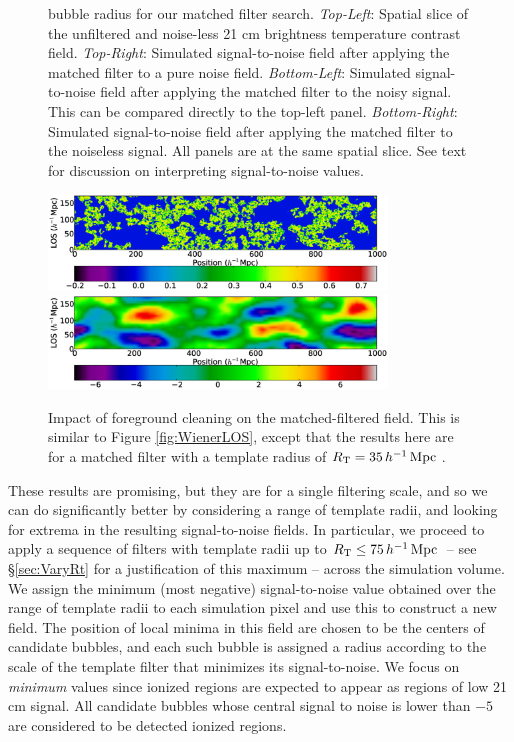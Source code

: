 \begin{figure}[h]
{    bubble radius for our matched filter search. \textit{Top-Left}: Spatial slice of the
    unfiltered and noise-less 21 cm brightness temperature contrast
    field. \textit{Top-Right}: Simulated signal-to-noise field after
    applying the matched filter to a pure noise
    field. \textit{Bottom-Left}: Simulated signal-to-noise field
    after applying the matched filter to the noisy
    signal. This can be compared directly to the top-left panel. \textit{Bottom-Right}: Simulated signal-to-noise field after applying the matched filter to the noiseless signal. All panels are at the same spatial slice. See text for discussion on interpreting signal-to-noise values.}
  \label{fig:ThreeFigureMatched}
\end{figure}


\begin{figure}[h]
  \centering
  \includegraphics[width=9cm]{f6a.eps}
  \includegraphics[width=9cm]{f6b.eps}
  \caption{Impact of foreground cleaning on the matched-filtered field. This is similar to Figure \ref{fig:WienerLOS}, except
that the results here are for a matched filter with a template 
radius of $R_{\text{T}} = 35 \,h^{-1}\,{\rm Mpc}\,$.}
  \label{fig:MatchedLOS}
\end{figure}

These results are promising, but they are for a single filtering scale, and
so we can 
do significantly better by considering a range of template radii, and looking
for extrema in the resulting signal-to-noise fields. In particular,
we proceed to apply a sequence of filters with template radii up to
$R_{\text{T}} \leq 75\,h^{-1}\,{\rm Mpc}\,$ -- see \S \ref{sec:VaryRt} for a justification of
this maximum -- across the simulation volume. 
We assign the minimum (most negative)
signal-to-noise value obtained over the range of template
radii to each simulation pixel and use this to construct a new field. The position of local minima
in this field are chosen to be the centers of candidate bubbles, and each such bubble is
assigned a radius according to the scale of the template filter that minimizes its
signal-to-noise. We focus on \textit{minimum} values since ionized regions are expected
to appear as regions of low 21 cm signal. All candidate bubbles whose central signal to noise
is lower than $-5$ are considered to be detected ionized regions.

